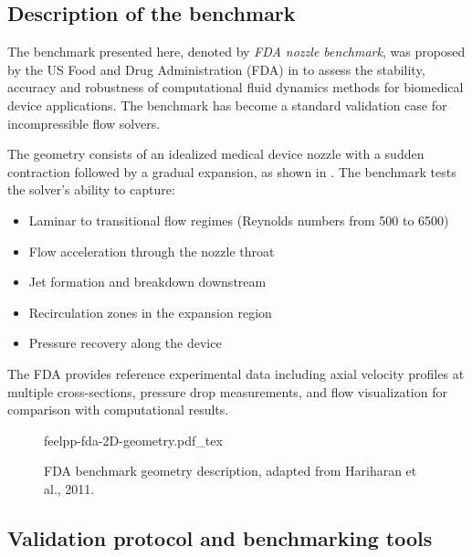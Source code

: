 \subsection{Description of the benchmark}

The benchmark presented here, denoted by \emph{FDA nozzle benchmark}, was proposed by the US Food and Drug Administration (FDA) in \cite{hariharan_multilaboratory_2011} to assess the stability, accuracy and robustness of computational fluid dynamics methods for biomedical device applications. The benchmark has become a standard validation case for incompressible flow solvers.

The geometry consists of an idealized medical device nozzle with a sudden contraction followed by a gradual expansion, as shown in . The benchmark tests the solver's ability to capture:
\begin{itemize}
\item Laminar to transitional flow regimes (Reynolds numbers from 500 to 6500)
\item Flow acceleration through the nozzle throat
\item Jet formation and breakdown downstream
\item Recirculation zones in the expansion region
\item Pressure recovery along the device
\end{itemize}

The FDA provides reference experimental data including axial velocity profiles at multiple cross-sections, pressure drop measurements, and flow visualization for comparison with computational results.

\begin{figure}[!ht]
  \centering
  \def\svgwidth{\textwidth}
  {feelpp-fda-2D-geometry.pdf_tex}
  \caption{FDA benchmark geometry description, adapted from Hariharan et al., 2011.}
  \label{fig:spec:app-feelpp-discr-2:fda:geometry}
\end{figure}



\subsection{Validation protocol and benchmarking tools}

